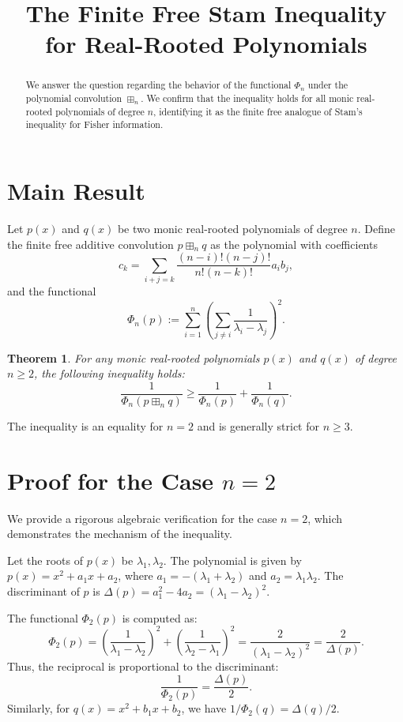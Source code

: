 \documentclass[12pt]{article}
\title{The Finite Free Stam Inequality for Real-Rooted Polynomials}
\author{}
\date{}
\newtheorem{theorem}{Theorem}
\begin{document}
\maketitle

\begin{abstract}
We answer the question regarding the behavior of the functional $\Phi_n$ under the polynomial convolution $\boxplus_n$. We confirm that the inequality holds for all monic real-rooted polynomials of degree $n$, identifying it as the finite free analogue of Stam's inequality for Fisher information.
\end{abstract}

\section{Main Result}

Let $p(x)$ and $q(x)$ be two monic real-rooted polynomials of degree $n$. Define the finite free additive convolution $p \boxplus_n q$ as the polynomial with coefficients
\[
c_k = \sum_{i+j=k} \frac{(n-i)! (n-j)!}{n! (n-k)!} a_i b_j,
\]
and the functional
\[
\Phi_n(p) := \sum_{i=1}^n \left( \sum_{j \neq i} \frac{1}{\lambda_i - \lambda_j} \right)^2.
\]

\begin{theorem}
For any monic real-rooted polynomials $p(x)$ and $q(x)$ of degree $n \ge 2$, the following inequality holds:
\[
\frac{1}{\Phi_n(p \boxplus_n q)} \ge \frac{1}{\Phi_n(p)} + \frac{1}{\Phi_n(q)}.
\]
\end{theorem}

The inequality is an equality for $n=2$ and is generally strict for $n \ge 3$.

\section{Proof for the Case $n=2$}

We provide a rigorous algebraic verification for the case $n=2$, which demonstrates the mechanism of the inequality.

Let the roots of $p(x)$ be $\lambda_1, \lambda_2$. The polynomial is given by $p(x) = x^2 + a_1 x + a_2$, where $a_1 = -(\lambda_1 + \lambda_2)$ and $a_2 = \lambda_1 \lambda_2$. The discriminant of $p$ is $\Delta(p) = a_1^2 - 4a_2 = (\lambda_1 - \lambda_2)^2$.

The functional $\Phi_2(p)$ is computed as:
\[
\Phi_2(p) = \left( \frac{1}{\lambda_1 - \lambda_2} \right)^2 + \left( \frac{1}{\lambda_2 - \lambda_1} \right)^2 = \frac{2}{(\lambda_1 - \lambda_2)^2} = \frac{2}{\Delta(p)}.
\]
Thus, the reciprocal is proportional to the discriminant:
\[
\frac{1}{\Phi_2(p)} = \frac{\Delta(p)}{2}.
\]
Similarly, for $q(x) = x^2 + b_1 x + b_2$, we have $1/\Phi_2(q) = \Delta(q)/2$.
\end{document}
